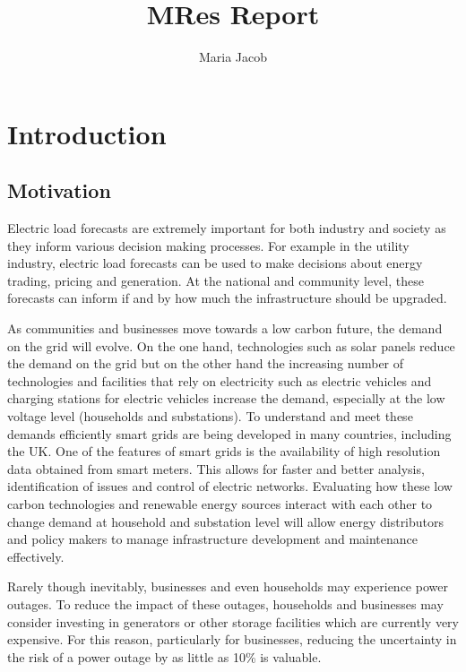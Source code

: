 \documentclass[a4paper]{article}
\title{MRes Report}
\author{Maria Jacob}
\begin{document}
\maketitle



\section{Introduction}
\subsection{Motivation}
\label{subsec:intro}
Electric load forecasts are extremely important for both industry and society as they inform various decision making processes. For example in the utility industry, electric load forecasts can be used to make decisions about energy trading, pricing and generation. At the national and community level, these forecasts can inform if and by how much the infrastructure should be upgraded.

As communities and businesses move towards a low carbon future, the demand on the grid will evolve. On the one hand, technologies such as solar panels reduce the demand on the grid but on the other hand the increasing number of technologies and facilities that rely on electricity such as electric vehicles and charging stations for electric vehicles increase the demand, especially at the low voltage level (households and substations). To understand and meet these demands efficiently smart grids are being developed in many countries, including the UK. One of the features of smart grids is the availability of high resolution data obtained from smart meters. This allows for faster and better analysis, identification of issues and control of electric networks. Evaluating how these low carbon technologies and renewable energy sources interact with each other to change demand at household and substation level will allow energy distributors and policy makers to manage infrastructure development and maintenance effectively.

Rarely though inevitably, businesses and even households may experience power outages. To reduce the impact of these outages, households and businesses may consider investing in generators or other storage facilities which are currently very expensive. For this reason, particularly for businesses, reducing the uncertainty in the risk of a power outage by as little as 10\% is valuable.
\end{document}
